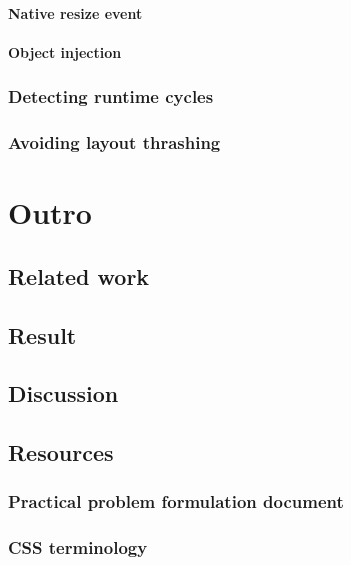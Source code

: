 \documentclass[a4paper,11pt]{kth-mag}
\begin{document}
        \subsection{Native resize event}
        \subsection{Object injection}
      \section{Detecting runtime cycles}\label{sec:imp_cycle_detector}
      \section{Avoiding layout thrashing}\label{sec:imp_batch_processor}

  \part{Outro}\label{part:outro}
    \chapter{Related work}
    \chapter{Result}
    \chapter{Discussion}
  \printbibliography
  \clearpage
  \printnoidxglossary[sort=standard, type=main]
  \printnoidxglossary[sort=standard, type=\acronymtype]
  \appendix
  \addappheadtotoc
    \chapter{Resources}
      \section{Practical problem formulation document}\label{sec:problem-formulation}
      \section{CSS terminology}
\end{document}
